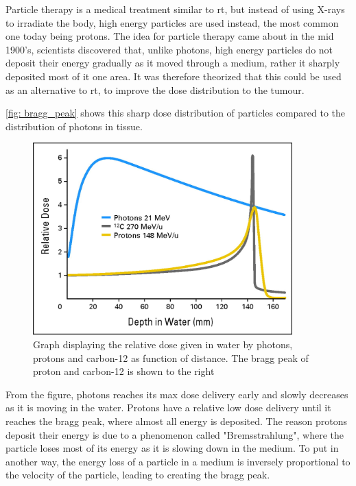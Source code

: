 \documentclass[main.tex]{subfiles}
\begin{document}
Particle therapy is a medical treatment similar to \gls{rt}, but instead of using X-rays to irradiate the body, high energy particles are used instead, the most common one today being protons. The idea for particle therapy came about in the mid 1900's, scientists discovered that, unlike photons, high energy particles do not deposit their energy gradually as it moved through a medium, rather it sharply deposited most of it one area. It was therefore theorized that this could be used as an alternative to \gls{rt}, to improve the dose distribution to the tumour. 

\autoref{fig: bragg_peak} shows this sharp dose distribution of particles compared to the distribution of photons in tissue.

 \begin{figure}[!htpb]
    \centering
    \includegraphics[width=10cm ]{images/bragg_peak.jpeg}
    \caption{Graph displaying the relative dose given in water by photons, protons and carbon-12 as function of distance. The bragg peak of proton and carbon-12 is shown to the right\cite{bragg_peak_image}}
    \label{fig: bragg_peak}
\end{figure}
\FloatBarrier 

From the figure, photons reaches its max dose delivery early and slowly decreases as it is moving in the water. Protons have a relative low dose delivery until it reaches the bragg peak, where almost all energy is deposited. The reason protons deposit their energy is due to a phenomenon called "Bremsstrahlung", where the particle loses most of its energy as it is slowing down in the medium. To put in another way, the energy loss of a particle in a medium is inversely proportional to the velocity of the particle, leading to creating the bragg peak.
\end{document}
